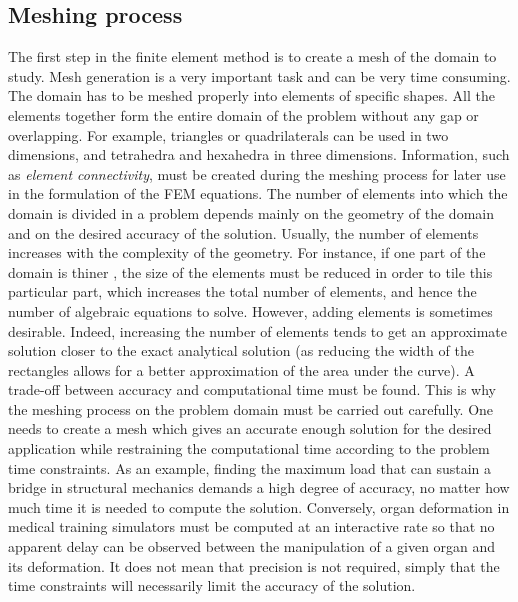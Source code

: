 	\subsection{Meshing process}
The first step in the finite element method is to create a mesh of the domain to study. Mesh generation is a very important task and can be very time consuming. The domain has to be meshed properly into elements of specific shapes. All the elements together form the entire domain of the problem without any gap or overlapping. For example, triangles or quadrilaterals can be used in two dimensions, and tetrahedra and hexahedra in three dimensions. Information, such as \emph{element connectivity}, must be created during the meshing process for later use in the formulation of the FEM equations. The number of elements into which the domain is divided in a problem depends mainly on the geometry of the domain and on the desired accuracy of the solution. Usually, the number of elements increases with the complexity of the geometry. For instance, if one part of the domain is thiner , the size of the elements must be reduced in order to tile this particular part, which increases the total number of elements, and hence  the number of algebraic equations to solve. However, adding elements is sometimes desirable. Indeed, increasing the number of elements tends to get an approximate solution closer to the exact analytical solution (as reducing the width of the rectangles allows for a better approximation of the area under the curve). A trade-off between accuracy and computational time must be found. This is why the meshing process on the problem domain must be carried out carefully. One needs to create a mesh which gives an accurate enough solution for the desired application while restraining the computational time according to the problem time constraints. As an example, finding the maximum load that can sustain a bridge in structural mechanics demands a high degree of accuracy, no matter how much time it is needed to compute the solution. Conversely, organ deformation in medical training simulators must be computed at an interactive rate so that no apparent delay can be observed between the manipulation of a given organ and its deformation. It does not mean that precision is not required, simply that the time constraints will necessarily limit the accuracy of the solution. 

	
